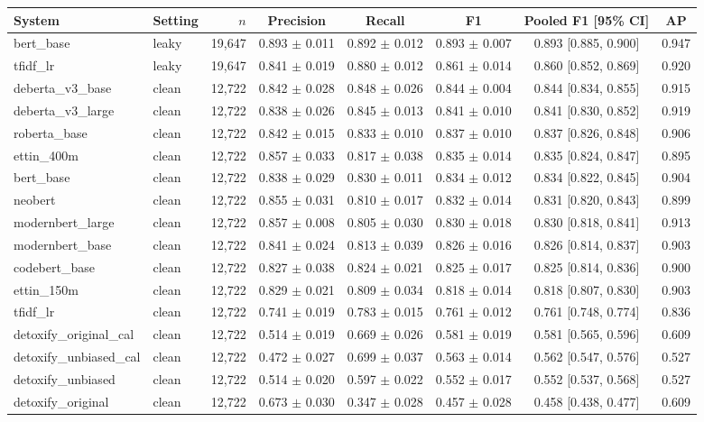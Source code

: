 \begin{tabular}{llrccccc}
\toprule
System & Setting & $n$ & Precision & Recall & F1 & Pooled F1 [95\% CI] & AP \\
\midrule
bert\_base & leaky & 19,647 & 0.893 $\pm$ 0.011 & 0.892 $\pm$ 0.012 & 0.893 $\pm$ 0.007 & 0.893 [0.885, 0.900] & 0.947 \\
tfidf\_lr & leaky & 19,647 & 0.841 $\pm$ 0.019 & 0.880 $\pm$ 0.012 & 0.861 $\pm$ 0.014 & 0.860 [0.852, 0.869] & 0.920 \\
deberta\_v3\_base & clean & 12,722 & 0.842 $\pm$ 0.028 & 0.848 $\pm$ 0.026 & 0.844 $\pm$ 0.004 & 0.844 [0.834, 0.855] & 0.915 \\
deberta\_v3\_large & clean & 12,722 & 0.838 $\pm$ 0.026 & 0.845 $\pm$ 0.013 & 0.841 $\pm$ 0.010 & 0.841 [0.830, 0.852] & 0.919 \\
roberta\_base & clean & 12,722 & 0.842 $\pm$ 0.015 & 0.833 $\pm$ 0.010 & 0.837 $\pm$ 0.010 & 0.837 [0.826, 0.848] & 0.906 \\
ettin\_400m & clean & 12,722 & 0.857 $\pm$ 0.033 & 0.817 $\pm$ 0.038 & 0.835 $\pm$ 0.014 & 0.835 [0.824, 0.847] & 0.895 \\
bert\_base & clean & 12,722 & 0.838 $\pm$ 0.029 & 0.830 $\pm$ 0.011 & 0.834 $\pm$ 0.012 & 0.834 [0.822, 0.845] & 0.904 \\
neobert & clean & 12,722 & 0.855 $\pm$ 0.031 & 0.810 $\pm$ 0.017 & 0.832 $\pm$ 0.014 & 0.831 [0.820, 0.843] & 0.899 \\
modernbert\_large & clean & 12,722 & 0.857 $\pm$ 0.008 & 0.805 $\pm$ 0.030 & 0.830 $\pm$ 0.018 & 0.830 [0.818, 0.841] & 0.913 \\
modernbert\_base & clean & 12,722 & 0.841 $\pm$ 0.024 & 0.813 $\pm$ 0.039 & 0.826 $\pm$ 0.016 & 0.826 [0.814, 0.837] & 0.903 \\
codebert\_base & clean & 12,722 & 0.827 $\pm$ 0.038 & 0.824 $\pm$ 0.021 & 0.825 $\pm$ 0.017 & 0.825 [0.814, 0.836] & 0.900 \\
ettin\_150m & clean & 12,722 & 0.829 $\pm$ 0.021 & 0.809 $\pm$ 0.034 & 0.818 $\pm$ 0.014 & 0.818 [0.807, 0.830] & 0.903 \\
tfidf\_lr & clean & 12,722 & 0.741 $\pm$ 0.019 & 0.783 $\pm$ 0.015 & 0.761 $\pm$ 0.012 & 0.761 [0.748, 0.774] & 0.836 \\
detoxify\_original\_cal & clean & 12,722 & 0.514 $\pm$ 0.019 & 0.669 $\pm$ 0.026 & 0.581 $\pm$ 0.019 & 0.581 [0.565, 0.596] & 0.609 \\
detoxify\_unbiased\_cal & clean & 12,722 & 0.472 $\pm$ 0.027 & 0.699 $\pm$ 0.037 & 0.563 $\pm$ 0.014 & 0.562 [0.547, 0.576] & 0.527 \\
detoxify\_unbiased & clean & 12,722 & 0.514 $\pm$ 0.020 & 0.597 $\pm$ 0.022 & 0.552 $\pm$ 0.017 & 0.552 [0.537, 0.568] & 0.527 \\
detoxify\_original & clean & 12,722 & 0.673 $\pm$ 0.030 & 0.347 $\pm$ 0.028 & 0.457 $\pm$ 0.028 & 0.458 [0.438, 0.477] & 0.609 \\
\bottomrule
\end{tabular}
